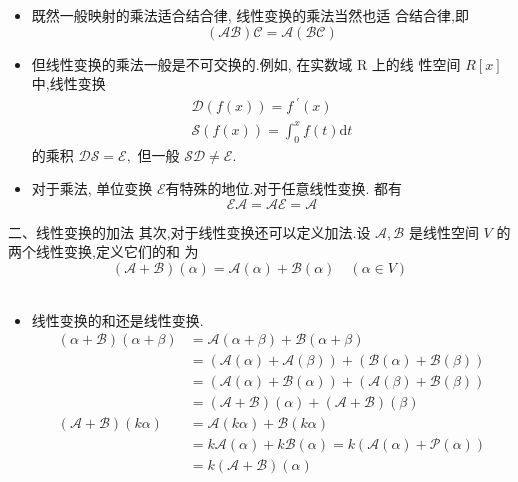 \documentclass[13pt]{beamer}
\def\A{\mathscr{A}}
\def\E{\mathscr{E}}
\begin{document}
\begin{frame}
\begin{itemize}
	\item
既然一般映射的乘法适合结合律, 线性变换的乘法当然也适 合\alert{结合律},即
\[
(\mathscr{A} \mathscr{B}) \mathscr{C}=\mathscr{A}(\mathscr{B} \mathscr{C})
\]
	\item 但线性变换的乘法一般是\alert{不可交换}的.例如, 在实数域 R 上的线 性空间 $R[x]$ 中,线性变换
\[
\begin{array}{c}
\mathscr{D}(f(x))=f^{\,\, \prime}(x) \\
\mathscr{S}(f(x))=\int_{0}^{x} f(t) \mathrm{d} t
\end{array}
\]
的乘积 $\mathscr{D}  \mathscr{S} =\mathscr{E},$ 但一般 $\mathscr{S} \mathscr{D} \neq \mathscr{E}$.

	\item 对于乘法, 单位变换 $\E$有特殊的地位.对于任意线性变换. 都有
\[
\E \A=\A \E=\A
\]
\end{itemize}
\end{frame}

\begin{frame}{二、线性变换的加法}
其次,对于线性变换还可以定义加法.设 $\mathscr{A}, \mathscr{B}$ 是线性空间 $V$ 的两个线性变换,定义它们的和 为
$$
(\mathscr{A}+\mathscr{B})({\alpha})=\mathscr{A}({\alpha})+\mathscr{B}({\alpha}) \quad({\alpha} \in V)
$$
\\[-10pt]
\begin{itemize}
	\item 线性变换的和还是线性变换. 
\begin{align*}
(\alpha+\mathscr{B})({\alpha}+{\beta}) &=\mathscr{A}({\alpha}+{\beta})+\mathscr{B}({\alpha}+{\beta}) \\
&=(\mathscr{A}({\alpha})+\mathscr{A}({\beta}))+(\mathscr{B}({\alpha})+\mathscr{B}({\beta})) \\
&=(\mathscr{A}({\alpha})+\mathscr{B}({\alpha}))+(\mathscr{A}({\beta})+\mathscr{B}({\beta})) \\
&=(\mathscr{A}+\mathscr{B})({\alpha})+(\mathscr{A}+\mathscr{B})({\beta}) \\
(\mathscr{A}+\mathscr{B})(k {\alpha}) &=\mathscr{A}(k {\alpha})+\mathscr{B}(k {\alpha}) \\
&=k \mathscr{A}({\alpha})+k \mathscr{B}({\alpha})=k(\mathscr{A}({\alpha})+\mathscr{P}({\alpha})) \\
&=k(\mathscr{A}+\mathscr{B})({\alpha})
\end{align*}
\end{itemize}
\end{frame}
\end{document}
